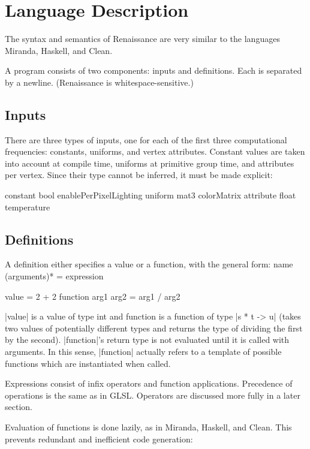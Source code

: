 \documentclass[review]{acmsiggraph}      %
\begin{document}
\section{Language Description}

The syntax and semantics of Renaissance are very similar to the languages 
Miranda, Haskell, and Clean.

A program consists of two components: inputs and definitions.  Each is
separated by a newline.  (Renaissance is whitespace-sensitive.)


\subsection{Inputs}

There are three types of inputs, one for each of the first three
computational frequencies: constants, uniforms, and vertex attributes.
Constant values are taken into account at compile time, uniforms at
primitive group time, and attributes per vertex.  Since their type
cannot be inferred, it must be made explicit:

\begin{MyVerb}
constant bool enablePerPixelLighting
uniform mat3 colorMatrix
attribute float temperature
\end{MyVerb}

\subsection{Definitions}

A definition either specifies a value or a function, with the general form:
name (arguments)* = expression

\begin{MyVerb}
value = 2 + 2
function arg1 arg2 = arg1 / arg2
\end{MyVerb}

|value| is a value of type int and function is a function of type
|s * t -> u| (takes two values of potentially different types and returns
the type of dividing the first by the second).  |function|'s return
type is not evaluated until it is called with arguments.  In this
sense, |function| actually refers to a template of possible functions
which are instantiated when called.

Expressions consist of infix operators and function applications.
Precedence of operations is the same as in GLSL.  Operators are
discussed more fully in a later section.

Evaluation of functions is done lazily, as in Miranda, Haskell, and
Clean.  This prevents redundant and inefficient code generation:
\end{document}
